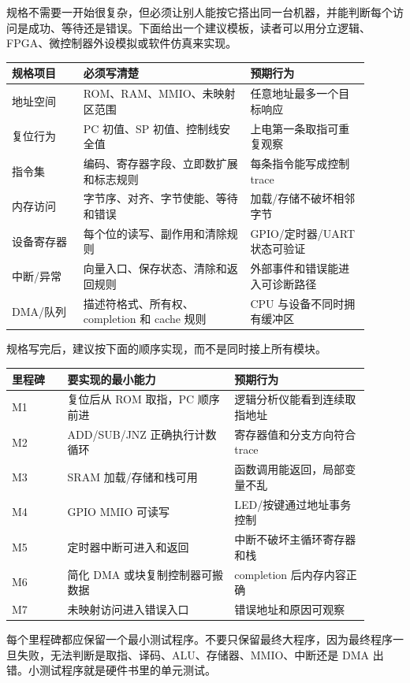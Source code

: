 规格不需要一开始很复杂，但必须让别人能按它搭出同一台机器，并能判断每个访问是成功、等待还是错误。下面给出一个建议模板，读者可以用分立逻辑、FPGA、微控制器外设模拟或软件仿真来实现。

\begin{longtable}{L{0.18\linewidth}L{0.42\linewidth}L{0.3\linewidth}}
\toprule
规格项目 & 必须写清楚 & 预期行为 \\
\midrule
地址空间 & ROM、RAM、MMIO、未映射区范围 & 任意地址最多一个目标响应 \\
复位行为 & PC 初值、SP 初值、控制线安全值 & 上电第一条取指可重复观察 \\
指令集 & 编码、寄存器字段、立即数扩展和标志规则 & 每条指令能写成控制 trace \\
内存访问 & 字节序、对齐、字节使能、等待和错误 & 加载/存储不破坏相邻字节 \\
设备寄存器 & 每个位的读写、副作用和清除规则 & GPIO/定时器/UART 状态可验证 \\
中断/异常 & 向量入口、保存状态、清除和返回规则 & 外部事件和错误能进入可诊断路径 \\
DMA/队列 & 描述符格式、所有权、completion 和 cache 规则 & CPU 与设备不同时拥有缓冲区 \\
\bottomrule
\end{longtable}

规格写完后，建议按下面的顺序实现，而不是同时接上所有模块。

\begin{longtable}{L{0.14\linewidth}L{0.42\linewidth}L{0.34\linewidth}}
\toprule
里程碑 & 要实现的最小能力 & 预期行为 \\
\midrule
M1 & 复位后从 ROM 取指，PC 顺序前进 & 逻辑分析仪能看到连续取指地址 \\
M2 & ADD/SUB/JNZ 正确执行计数循环 & 寄存器值和分支方向符合 trace \\
M3 & SRAM 加载/存储和栈可用 & 函数调用能返回，局部变量不乱 \\
M4 & GPIO MMIO 可读写 & LED/按键通过地址事务控制 \\
M5 & 定时器中断可进入和返回 & 中断不破坏主循环寄存器和栈 \\
M6 & 简化 DMA 或块复制控制器可搬数据 & completion 后内存内容正确 \\
M7 & 未映射访问进入错误入口 & 错误地址和原因可观察 \\
\bottomrule
\end{longtable}

每个里程碑都应保留一个最小测试程序。不要只保留最终大程序，因为最终程序一旦失败，无法判断是取指、译码、ALU、存储器、MMIO、中断还是 DMA 出错。小测试程序就是硬件书里的单元测试。

